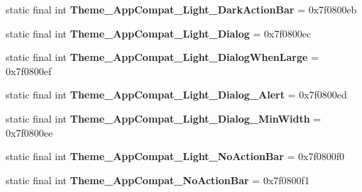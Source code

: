 \begin{DoxyCompactItemize}
\item 
\hypertarget{classandroid_1_1support_1_1v7_1_1appcompat_1_1_r_1_1style_a6de852fddd40a4c6612af07b17de8796}{}static final int {\bfseries Theme\+\_\+\+App\+Compat\+\_\+\+Light\+\_\+\+Dark\+Action\+Bar} = 0x7f0800eb\label{classandroid_1_1support_1_1v7_1_1appcompat_1_1_r_1_1style_a6de852fddd40a4c6612af07b17de8796}

\item 
\hypertarget{classandroid_1_1support_1_1v7_1_1appcompat_1_1_r_1_1style_a1ebb6bd5786d54f735c9379d2b83720f}{}static final int {\bfseries Theme\+\_\+\+App\+Compat\+\_\+\+Light\+\_\+\+Dialog} = 0x7f0800ec\label{classandroid_1_1support_1_1v7_1_1appcompat_1_1_r_1_1style_a1ebb6bd5786d54f735c9379d2b83720f}

\item 
\hypertarget{classandroid_1_1support_1_1v7_1_1appcompat_1_1_r_1_1style_ac8cb621e0bc006a8e787cc01fa5a019b}{}static final int {\bfseries Theme\+\_\+\+App\+Compat\+\_\+\+Light\+\_\+\+Dialog\+When\+Large} = 0x7f0800ef\label{classandroid_1_1support_1_1v7_1_1appcompat_1_1_r_1_1style_ac8cb621e0bc006a8e787cc01fa5a019b}

\item 
\hypertarget{classandroid_1_1support_1_1v7_1_1appcompat_1_1_r_1_1style_a3154c269ba4155524296e31f2fb85495}{}static final int {\bfseries Theme\+\_\+\+App\+Compat\+\_\+\+Light\+\_\+\+Dialog\+\_\+\+Alert} = 0x7f0800ed\label{classandroid_1_1support_1_1v7_1_1appcompat_1_1_r_1_1style_a3154c269ba4155524296e31f2fb85495}

\item 
\hypertarget{classandroid_1_1support_1_1v7_1_1appcompat_1_1_r_1_1style_a31c9ec44a65783612f967848055d20e9}{}static final int {\bfseries Theme\+\_\+\+App\+Compat\+\_\+\+Light\+\_\+\+Dialog\+\_\+\+Min\+Width} = 0x7f0800ee\label{classandroid_1_1support_1_1v7_1_1appcompat_1_1_r_1_1style_a31c9ec44a65783612f967848055d20e9}

\item 
\hypertarget{classandroid_1_1support_1_1v7_1_1appcompat_1_1_r_1_1style_ab207bbb6037b2de95c4385c5bb64c186}{}static final int {\bfseries Theme\+\_\+\+App\+Compat\+\_\+\+Light\+\_\+\+No\+Action\+Bar} = 0x7f0800f0\label{classandroid_1_1support_1_1v7_1_1appcompat_1_1_r_1_1style_ab207bbb6037b2de95c4385c5bb64c186}

\item 
\hypertarget{classandroid_1_1support_1_1v7_1_1appcompat_1_1_r_1_1style_a8519c957330167d04ac87177caf9ae06}{}static final int {\bfseries Theme\+\_\+\+App\+Compat\+\_\+\+No\+Action\+Bar} = 0x7f0800f1\label{classandroid_1_1support_1_1v7_1_1appcompat_1_1_r_1_1style_a8519c957330167d04ac87177caf9ae06}


\end{DoxyCompactItemize}

